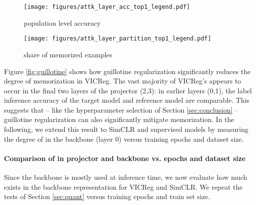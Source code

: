 \begin{figure*}[h]
\captionsetup[subfigure]{font=scriptsize,labelfont=scriptsize}
     \centering
     \begin{subfigure}[b]{0.49\textwidth}
         \centering
         \texttt{[image: figures/attk\_layer\_acc\_top1\_legend.pdf]}
         \caption{population level accuracy}
     \end{subfigure}
     \begin{subfigure}[b]{0.49\textwidth}
         \centering
         \texttt{[image: figures/attk\_layer\_partition\_top1\_legend.pdf]}
         \caption{share of memorized examples}
     \end{subfigure}
     \hfill
\caption{
\dejavu memorization versus layer from backbone (0) to projector output (3). The memorization tests of Section \ref{sec:quant} are evaluated at each level of the VICReg projector. We see that \dejavu is significantly stronger closer to the projector output and nearly zero near the backbone. Interestingly, most memorization appears to occur in the final two layers of VICReg.
}
\label{fig:guillotine}
\end{figure*}

Figure \ref{fig:guillotine} shows how guillotine regularization significantly reduces the degree of memorization in VICReg. The vast majority of VICReg's \dejavu appears to occur in the final two layers of the projector (2,3): in earlier layers (0,1), the label inference accuracy of the target model and reference model are comparable. This suggests that -- like the hyperparameter selection of Section \ref{sec:conclusion} -- guillotine regularization can also significantly mitigate \dejavu memorization. In the following, we extend this result to SimCLR and supervised models by measuring the degree of \dejavu in the backbone (layer 0) versus training epochs and dataset size. 

\newpage

\paragraph{Comparison of \dejavu in projector and backbone vs. epochs and dataset size}
Since the backbone is mostly used at inference time, we now evaluate how much \dejavu exists in the backbone representation for VICReg and SimCLR. We repeat the tests of Section \ref{sec:quant} versus training epochs and train set size. 

